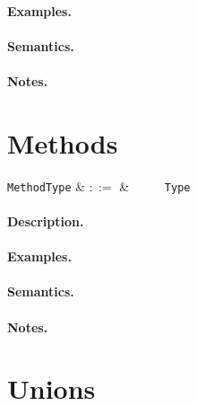 \paragraph{Examples.}

\paragraph{Semantics.}

\paragraph{Notes.}


\section{Methods}

\begin{syntax}
  \verb+MethodType+ & $::=$ & \ \token{(}\
  \ \token{)}\ \token{=>}\ \verb+Type+\\
\end{syntax}

\paragraph{Description.}  

\paragraph{Examples.}

\paragraph{Semantics.}

\paragraph{Notes.}


\section{Unions}

